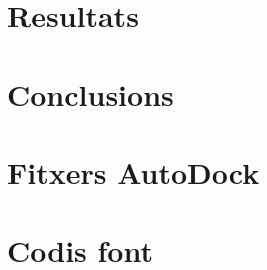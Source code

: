 \documentclass[titlepage,a4paper,12pt]{book}
\begin{document}
\chapter{Resultats}

\chapter{Conclusions\label{chap:conclusions}}

\appendix 
\chapter{Fitxers AutoDock}
\chapter{Codis font}



\end{document}
